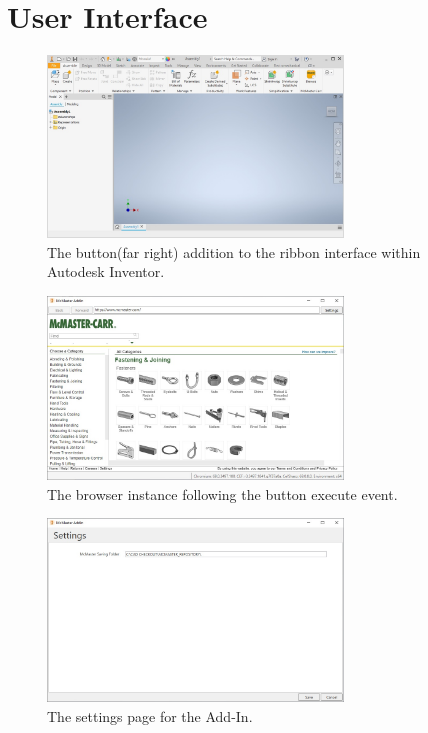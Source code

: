 \documentclass[12pt, letterpaper]{article}
\begin{document}
\section{User Interface}
\begin{figure}[H]
    \centering
    \includegraphics[width=0.7\textwidth]{Figures/mcMasterButton.JPG}
    \caption{The button(far right) addition to the ribbon interface within Autodesk Inventor.}
\end{figure}
\begin{figure}[H]
    \centering
    \includegraphics[width=0.7\textwidth]{Figures/webBrowserView.jpg}
    \caption{The browser instance following the button execute event.}
\end{figure}
\begin{figure}[H]
    \centering
    \includegraphics[width=0.7\textwidth]{Figures/webBrowserSettings.jpg}
    \caption{The settings page for the Add-In.}
\end{figure}
\end{document}
